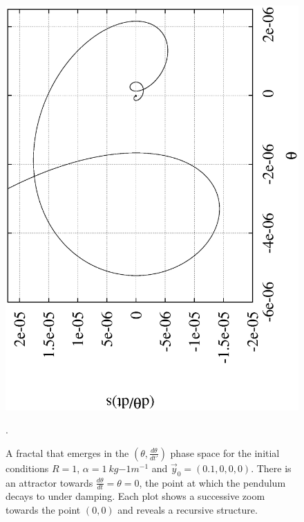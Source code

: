 \documentclass[10pt,a4paper]{article}
\begin{document}
\begin{figure}[h!]
\begin{center}
\includegraphics[scale = 0.3, angle =-90]{frac4.eps}
\caption{A fractal that emerges in the $\left(\theta,\frac{d\theta}{dt'}\right)$ phase space for the initial conditions $R = 1$, $\alpha = 1\:kg{-1}m^{-1}$ and $\vec{y}_{0}=(0.1,0,0,0)$. There is an attractor towards $\frac{d\theta}{dt}=\theta=0$, the point at which the pendulum decays to under damping. Each plot shows a successive zoom towards the point $(0,0)$ and reveals a recursive structure.}. 
\label{fig:Fractal}
\end{center}
\end{figure}
\end{document}
